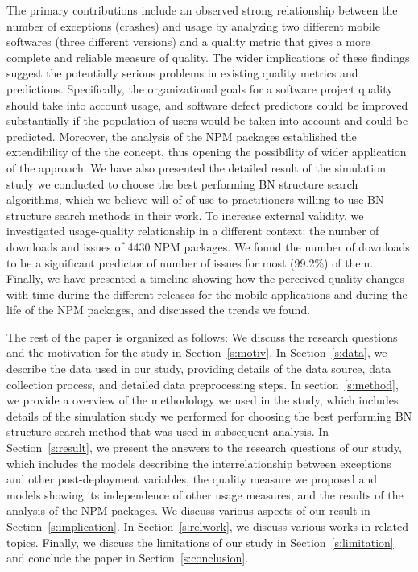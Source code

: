 \documentclass[smallcondensed]{svjour3}     %
\begin{document}
The primary contributions include an observed strong
relationship between the number of exceptions (crashes) and usage by
analyzing two different mobile softwares (three different versions)
and a quality metric that gives a more
complete and reliable measure of quality. The wider implications of
these findings suggest the potentially serious problems in existing
quality metrics and predictions. Specifically, the organizational
goals for a software project quality should take into account usage,
and software defect predictors could be improved substantially if
the population of users would be taken into account and could be
predicted. Moreover, the analysis of the NPM packages established the
extendibility of the the concept, thus opening the possibility of
wider application of the approach. We have also presented the 
detailed result of the simulation study
we conducted to choose the best performing BN structure search
algorithms, which we believe will of of use to practitioners willing
to use BN structure search methods in their work. To increase
external validity, we investigated usage-quality relationship in a
different context: the number of downloads and issues of 4430 NPM
packages. We found the number of downloads to be a significant
predictor of number of issues for most (99.2\%) of them. Finally, we
have presented a timeline showing how the perceived quality changes
with time during the different releases for the mobile applications
and during the life of the NPM packages, and discussed the trends we
found.


The rest of the paper is organized as follows: We discuss the research questions and the motivation for the study in Section~\ref{s:motiv}. In Section~\ref{s:data}, we describe the data used in our study, providing details of the data source, data collection process, and detailed data preprocessing steps.
In section~\ref{s:method}, we provide a overview of the methodology we used in the study, which includes details of the simulation study we performed for choosing the best performing BN structure search method that was used in subsequent analysis. In Section~\ref{s:result}, we present the answers to the research questions of our study, which includes the models describing the interrelationship between exceptions and other post-deployment variables, the quality measure we proposed and models showing its independence of other usage measures, and the results of the analysis of the NPM packages. We discuss various aspects of our result in Section~\ref{s:implication}. In Section~\ref{s:relwork}, we discuss various works in related topics. Finally, we discuss the limitations of our study in Section~\ref{s:limitation} and conclude the paper in Section~\ref{s:conclusion}.  
\end{document}
